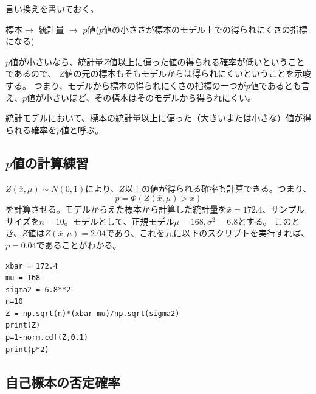 言い換えを書いておく。
\begin{center}
    標本$\rightarrow$ 統計量 $\rightarrow$ $p$値($p$値の小ささが標本のモデル上での得られにくさの指標になる)
\end{center}


$p$値が小さいなら、統計量$Z$値以上に偏った値の得られる確率が低いということであるので、
$Z$値の元の標本もそもモデルからは得られにくいということを示唆する。
つまり、モデルから標本の得られにくさの指標の一つが$p$値であるとも言え、$p$値が小さいほど、その標本はそのモデルから得られにくい。

\begin{defi}
    統計モデルにおいて、標本の統計量以上に偏った（大きいまたは小さな）値が得られる確率を$p$値と呼ぶ。
\end{defi}


\subsection{$p$値の計算練習}
$Z(\bar{x},\mu)\sim N(0,1)$により、$Z$以上の値が得られる確率も計算できる。つまり、
\begin{equation*}
    p = \varPhi(Z(\bar{x},\mu)>x)
\end{equation*}
を計算させる。モデルからえた標本から計算した統計量を$\bar{x}=172.4$、サンプルサイズを$n=10$。モデルとして、正規モデル$\mu=168,\sigma^2=6.8$とする。
このとき、$Z$値は$Z(\bar{x},\mu)=2.04$であり、これを元に以下のスクリプトを実行すれば、$p=0.04$であることがわかる。

\begin{lstlisting}
xbar = 172.4
mu = 168
sigma2 = 6.8**2
n=10
Z = np.sqrt(n)*(xbar-mu)/np.sqrt(sigma2)
print(Z)
p=1-norm.cdf(Z,0,1)
print(p*2)
\end{lstlisting}



\subsection{自己標本の否定確率}

